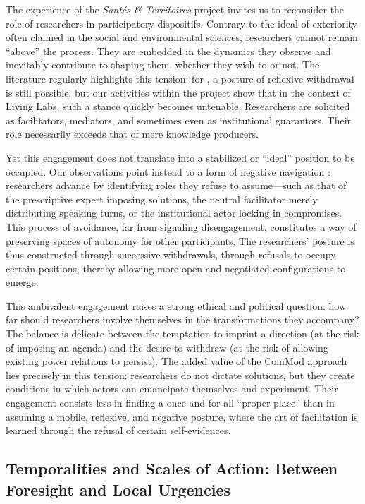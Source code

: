 \documentclass{article}
\begin{document}
The experience of the \textit{Santés \& Territoires} project invites us to reconsider the role of researchers in participatory dispositifs. Contrary to the ideal of exteriority often claimed in the social and environmental sciences, researchers cannot remain “above” the process. They are embedded in the dynamics they observe and inevitably contribute to shaping them, whether they wish to or not. The literature regularly highlights this tension: for \textcite{laslaz_jalons_2017}, a posture of reflexive withdrawal is still possible, but our activities within the project show that in the context of Living Labs, such a stance quickly becomes untenable. Researchers are solicited as facilitators, mediators, and sometimes even as institutional guarantors. Their role necessarily exceeds that of mere knowledge producers.  

Yet this engagement does not translate into a stabilized or “ideal” position to be occupied. Our observations point instead to a form of negative navigation \parencite{morizot_manieres_2020}: researchers advance by identifying roles they refuse to assume—such as that of the prescriptive expert imposing solutions, the neutral facilitator merely distributing speaking turns, or the institutional actor locking in compromises. This process of avoidance, far from signaling disengagement, constitutes a way of preserving spaces of autonomy for other participants. The researchers’ posture is thus constructed through successive withdrawals, through refusals to occupy certain positions, thereby allowing more open and negotiated configurations to emerge.  

This ambivalent engagement raises a strong ethical and political question: how far should researchers involve themselves in the transformations they accompany? The balance is delicate between the temptation to imprint a direction (at the risk of imposing an agenda) and the desire to withdraw (at the risk of allowing existing power relations to persist). The added value of the ComMod approach lies precisely in this tension: researchers do not dictate solutions, but they create conditions in which actors can emancipate themselves and experiment. Their engagement consists less in finding a once-and-for-all “proper place” than in assuming a mobile, reflexive, and negative posture, where the art of facilitation is learned through the refusal of certain self-evidences.  

\subsection{Temporalities and Scales of Action: Between Foresight and Local Urgencies}
\end{document}
